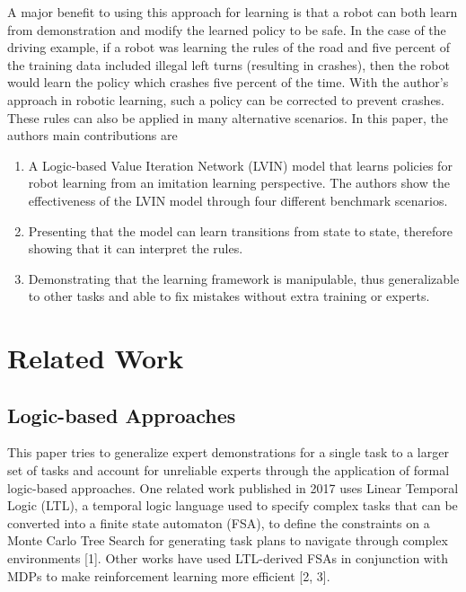 \documentclass[letterpaper, 10 pt, conference]{ieeeconf}  %
\begin{document}
\newline
\indent A major benefit to using this approach for learning is that a robot can both learn from demonstration and modify the learned policy to be safe. In the case of the driving example, if a robot was learning the rules of the road and five percent of the training data included illegal left turns (resulting in crashes), then the robot would learn the policy which crashes five percent of the time. With the author's approach in robotic learning, such a policy can be corrected to prevent crashes. These rules can also be applied in many alternative scenarios.
\newline
\indent In this paper, the authors main contributions are
\begin{enumerate}
  \item A Logic-based Value Iteration Network (LVIN) model that learns policies for robot learning from an imitation learning perspective. The authors show the effectiveness of the LVIN model through four different benchmark scenarios.
  \item Presenting that the model can learn transitions from state to state, therefore showing that it can interpret the rules.
  \item Demonstrating that the learning framework is manipulable, thus generalizable to other tasks and able to fix mistakes without extra training or experts.
\end{enumerate}

\section{Related Work}

\subsection{Logic-based Approaches}

This paper tries to generalize expert demonstrations for a single task to a larger set of tasks and account for unreliable experts through the application of formal logic-based approaches. One related work published in 2017 uses Linear Temporal Logic (LTL), a temporal logic language used to specify complex tasks that can be converted into a finite state automaton (FSA), to define the constraints on a Monte Carlo Tree Search for generating task plans to navigate through complex environments [1]. Other works have used LTL-derived FSAs in conjunction with MDPs to make reinforcement learning more efficient [2, 3].
\end{document}
